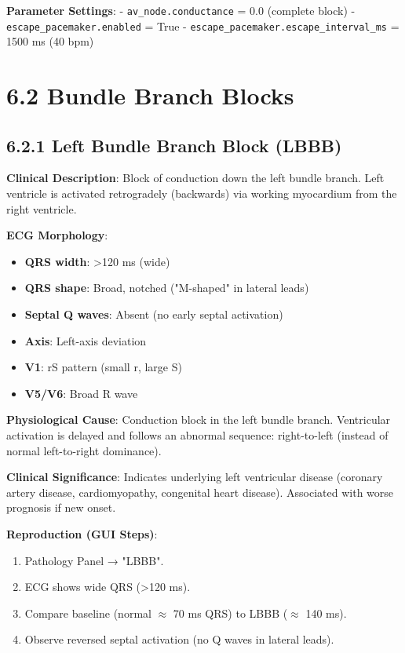 \documentclass[12pt,oneside,a4paper]{book}
\newcommand{\code}[1]{\texttt{#1}}
\begin{document}
\textbf{Parameter Settings}:
- \code{av\_node.conductance} = 0.0 (complete block)
- \code{escape\_pacemaker.enabled} = True
- \code{escape\_pacemaker.escape\_interval\_ms} = 1500 ms (40 bpm)

\section{6.2 Bundle Branch Blocks}

\subsection{6.2.1 Left Bundle Branch Block (LBBB)}

\textbf{Clinical Description}:
Block of conduction down the left bundle branch. Left ventricle is activated retrogradely (backwards) via working myocardium from the right ventricle.

\textbf{ECG Morphology}:
\begin{itemize}
  \item \textbf{QRS width}: \textgreater 120 ms (wide)
  \item \textbf{QRS shape}: Broad, notched ("M-shaped" in lateral leads)
  \item \textbf{Septal Q waves}: Absent (no early septal activation)
  \item \textbf{Axis}: Left-axis deviation
  \item \textbf{V1}: rS pattern (small r, large S)
  \item \textbf{V5/V6}: Broad R wave
\end{itemize}

\textbf{Physiological Cause}:
Conduction block in the left bundle branch. Ventricular activation is delayed and follows an abnormal sequence: right-to-left (instead of normal left-to-right dominance).

\textbf{Clinical Significance}:
Indicates underlying left ventricular disease (coronary artery disease, cardiomyopathy, congenital heart disease). Associated with worse prognosis if new onset.

\textbf{Reproduction (GUI Steps)}:
\begin{enumerate}
  \item Pathology Panel → "LBBB".
  \item ECG shows wide QRS (\textgreater 120 ms).
  \item Compare baseline (normal \(\approx\) 70 ms QRS) to LBBB (\(\approx\) 140 ms).
  \item Observe reversed septal activation (no Q waves in lateral leads).
\end{enumerate}
\end{document}
